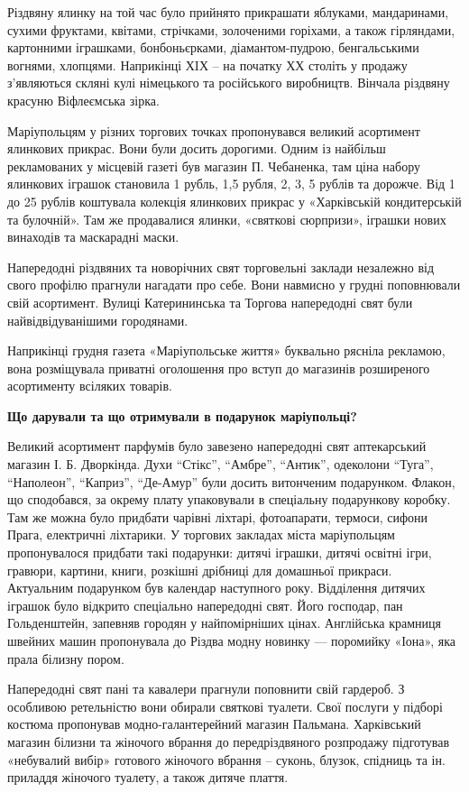 Різдвяну ялинку на той час було прийнято прикрашати яблуками, мандаринами,
сухими фруктами, квітами, стрічками, золоченими горіхами, а також гірляндами,
картонними іграшками, бонбоньєрками, діамантом-пудрою, бенгальськими вогнями,
хлопцями. Наприкінці ХIХ – на початку ХХ століть у продажу з'являються скляні
кулі німецького та російського виробництв. Вінчала різдвяну красуню Віфлеємська
зірка.

Маріупольцям у різних торгових точках пропонувався великий асортимент ялинкових
прикрас. Вони були досить дорогими. Одним із найбільш рекламованих у місцевій
газеті був магазин П. Чебаненка, там ціна набору ялинкових іграшок становила 1
рубль, 1,5 рубля, 2, 3, 5 рублів та дорожче. Від 1 до 25 рублів коштувала
колекція ялинкових прикрас у «Харківській кондитерській та булочній». Там же
продавалися ялинки, «святкові сюрпризи», іграшки нових винаходів та маскарадні
маски.

Напередодні різдвяних та новорічних свят торговельні заклади незалежно від
свого профілю прагнули нагадати про себе. Вони навмисно у грудні поповнювали
свій асортимент. Вулиці Катерининська та Торгова напередодні свят були
найвідвідуванішими городянами.

Наприкінці грудня газета «Маріупольське життя» буквально рясніла рекламою, вона
розміщувала приватні оголошення про вступ до магазинів розширеного асортименту
всіляких товарів.

\textbf{Що дарували та що отримували в подарунок маріупольці?}

Великий асортимент парфумів було завезено напередодні свят аптекарський магазин
І. Б. Дворкінда. Духи \enquote{Стікс}, \enquote{Амбре}, \enquote{Антик},
одеколони \enquote{Туга}, \enquote{Наполеон}, \enquote{Каприз},
\enquote{Де-Амур} були досить витонченим подарунком. Флакон, що сподобався, за
окрему плату упаковували в спеціальну подарункову коробку. Там же можна було
придбати чарівні ліхтарі, фотоапарати, термоси, сифони Прага, електричні
ліхтарики. У торгових закладах міста маріупольцям пропонувалося придбати такі
подарунки: дитячі іграшки, дитячі освітні ігри, гравюри, картини, книги,
розкішні дрібниці для домашньої прикраси. Актуальним подарунком був календар
наступного року. Відділення дитячих іграшок було відкрито спеціально
напередодні свят. Його господар, пан Гольденштейн, запевняв городян у
найпомірніших цінах. Англійська крамниця швейних машин пропонувала до Різдва
модну новинку — поромийку «Іона», яка прала білизну пором.

Напередодні свят пані та кавалери прагнули поповнити свій гардероб. З особливою
ретельністю вони обирали святкові туалети. Свої послуги у підборі костюма
пропонував модно-галантерейний магазин Пальмана. Харківський магазин білизни та
жіночого вбрання до передріздвяного розпродажу підготував «небувалий вибір»
готового жіночого вбрання – суконь, блузок, спідниць та ін. приладдя жіночого
туалету, а також дитяче плаття.

